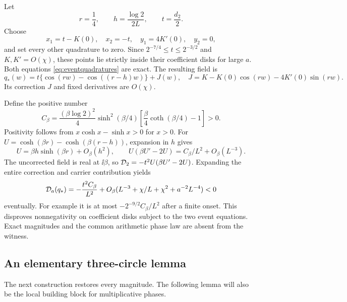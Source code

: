 Let
\[
 r=\frac14,\qquad h=\frac{\log2}{2L},\qquad t=\frac{d_2}{2}.
\]
Choose
\[
 x_1=t-K(0),\quad x_2=-t,\quad
 y_1=4K'(0),\quad y_2=0,
\]
and set every other quadrature to zero. Since
\(2^{-7/4}\le t\le2^{-3/2}\) and \(K,K'=O(\chi)\), these points
lie strictly inside their coefficient disks for large \(a\).
Both equations \eqref{eq:eventquadratures} are exact. The resulting
field is
\begin{equation}\label{eq:diskfield}
 q_*(w)=t\{\cos(rw)-\cos((r-h)w)\}+J(w),
 \quad J=K-K(0)\cos(rw)-4K'(0)\sin(rw).
\end{equation}
Its correction \(J\) and fixed derivatives are \(O(\chi)\).

Define the positive number
\begin{equation}\label{eq:Cbeta}
 C_\beta=\frac{(\beta\log2)^2}{4}\sinh^2(\beta/4)
             \left[\frac\beta4\coth(\beta/4)-1\right]>0.
\end{equation}
Positivity follows from \(x\cosh x-\sinh x>0\) for \(x>0\).
For \(U=\cosh(\beta r)-\cosh(\beta(r-h))\), expansion in \(h\) gives
\[
 U=\beta h\sinh(\beta r)+O_\beta(h^2),\qquad
 U(\beta U'-2U)=C_\beta/L^2+O_\beta(L^{-3}).
\]
The uncorrected field is real at \(\ii\beta\), so
\(\mathcal D_2=-t^2U(\beta U'-2U)\). Expanding the entire correction and
carrier contribution yields
\begin{equation}\label{eq:disknegative}
 \mathcal D_a(q_*)=-\frac{t^2C_\beta}{L^2}
   +O_\beta(L^{-3}+\chi/L+\chi^2+a^{-2}L^{-4})<0
\end{equation}
eventually. For example it is at most
\(-2^{-9/2}C_\beta/L^2\) after a finite onset.
This disproves nonnegativity on coefficient disks subject to the two
event equations. Exact magnitudes and the common arithmetic phase law
are absent from the witness.

\subsection{An elementary three-circle lemma}

The next construction restores every magnitude. The following lemma
will also be the local building block for multiplicative phases.

